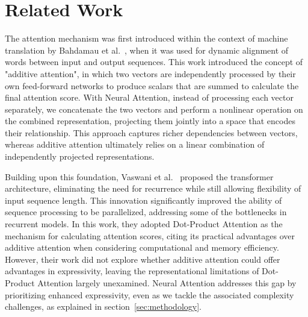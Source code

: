 \documentclass{article}
\begin{document}
\section{Related Work}
\label{sec:related_work}
The attention mechanism was first introduced within the context of machine translation by Bahdamau et al.~\cite{bahdanau2014neural}, when it was used for dynamic alignment of words between input and output sequences. This work introduced the concept of "additive attention", in which two vectors are independently processed by their own feed-forward networks to produce scalars that are summed to calculate the final attention score. With Neural Attention, instead of processing each vector separately, we concatenate the two vectors and perform a nonlinear operation on the combined representation, projecting them jointly into a space that encodes their relationship. This approach captures richer dependencies between vectors, whereas additive attention ultimately relies on a linear combination of independently projected representations.

Building upon this foundation, Vaswani et al.~\cite{vaswani2017attention} proposed the transformer architecture, eliminating the need for recurrence while still allowing flexibility of input sequence length. This innovation significantly improved the ability of sequence processing to be parallelized, addressing some of the bottlenecks in recurrent models. In this work, they adopted Dot-Product Attention as the mechanism for calculating attention scores, citing its practical advantages over additive attention when considering computational and memory efficiency. However, their work did not explore whether additive attention could offer advantages in expressivity, leaving the representational limitations of Dot-Product Attention largely unexamined. Neural Attention addresses this gap by prioritizing enhanced expressivity, even as we tackle the associated complexity challenges, as explained in section~\ref{sec:methodology}.
\end{document}

